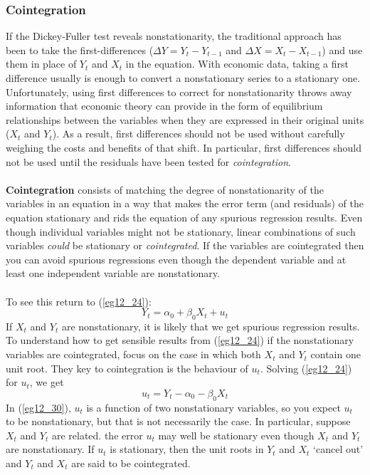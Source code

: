 \documentclass[11pt]{article}
\begin{document}
\subsubsection{Cointegration}
If the Dickey-Fuller test reveals nonstationarity, the traditional approach has been to take the first-differences ($\Delta Y = Y_t - Y_{t-1}$ and $\Delta X = X_t - X_{t-1}$) and use them in place of $Y_t$ and $X_t$ in the equation. With economic data, taking a first difference usually is enough to convert a nonstationary series to a stationary one. Unfortunately, using first differences to correct for nonstationarity throws away information that economic theory can provide in the form of equilibrium relationships between the variables when they are expressed in their original units ($X_t$ and $Y_t$). As a result, first differences should not be used without carefully weighing the costs and benefits of that shift. In particular, first differences should not be used until the residuals have been tested for \textit{cointegration}.\\ \\
\textbf{Cointegration} consists of matching the degree of nonstationarity of the variables in an equation in a way that makes the error term (and residuals) of the equation stationary and rids the equation of any spurious regression results. Even though individual variables might not be stationary, linear combinations of such variables \textit{could} be stationary or \textit{cointegrated}. If the variables are cointegrated then you can avoid spurious regressions even though the dependent variable and at least one independent variable are nonstationary.\\ \\
To see this return to (\ref{eg12_24}):
\begin{equation*}
Y_t = \alpha_0 + \beta_0X_t + u_t 
\end{equation*}
If $X_t$ and $Y_t$ are nonstationary, it is likely that we get spurious regression results. To understand how to get sensible results from (\ref{eg12_24}) if the nonstationary variables are cointegrated, focus on the case in which both $X_t$ and $Y_t$ contain one unit root. They key to cointegration is the behaviour of $u_t$. Solving (\ref{eg12_24}) for $u_t$, we get
\begin{equation}
u_t = Y_t - \alpha_0 - \beta_0X_t \label{eg12_30}
\end{equation}
In (\ref{eg12_30}), $u_t$ is a function of two nonstationary variables, so you expect $u_t$ to be nonstationary, but that is not necessarily the case. In particular, suppose $X_t$ and $Y_t$ are related. the error $u_t$ may well be stationary even though $X_t$ and $Y_t$ are nonstationary. If $u_t$ is stationary, then the unit roots in $Y_t$ and $X_t$ `cancel out' and $Y_t$ and $X_t$ are said to be cointegrated. \\ \\
\end{document}
